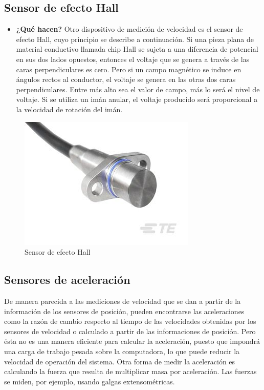 \subsection*{Sensor de efecto Hall}
\begin{itemize}
	\item \textbf{¿Qué hacen?} Otro dispositivo de medición de velocidad es el sensor de efecto Hall, cuyo principio se describe a continuación. Si una pieza plana de material conductivo llamada chip Hall se sujeta a una diferencia de potencial en sus dos lados opuestos, entonces el voltaje que se genera a través de las caras perpendiculares es cero. Pero si un campo magnético se induce en ángulos rectos al conductor, el voltaje se genera en las otras dos caras perpendiculares. Entre más alto sea el valor de campo, más lo será el nivel de voltaje. Si se utiliza un imán anular, el voltaje producido será proporcional a la velocidad de rotación del imán. \cite{TE_Connectivity_Sensor}
\end{itemize}


\begin{figure}[h]
	\centering
	{%
		\includegraphics[width=0.4\linewidth]{img/sensorhall}%
		\caption{Sensor de efecto Hall}
		\label{fig:sensorhall}
	}
\end{figure}


\subsection{Sensores de aceleración} De manera parecida a las mediciones de velocidad que se dan a partir de la información de los sensores de posición, pueden encontrarse las aceleraciones como la razón de cambio respecto al tiempo de las velocidades obtenidas por los sensores de velocidad o calculado a partir de las informaciones de posición. Pero ésta no es una manera eficiente para calcular la aceleración, puesto que impondrá una carga de trabajo pesada sobre la computadora, lo que puede reducir la velocidad de operación del sistema. Otra forma de medir la aceleración es calculando la fuerza que resulta de multiplicar masa por aceleración. Las fuerzas se miden, por ejemplo, usando galgas extensométricas. 

